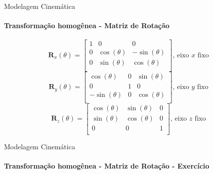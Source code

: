 \documentclass{beamer}
\begin{document}
\begin{frame}{Modelagem Cinemática}
    \framesubtitle{Transformação homogênea - Matriz de Rotação}
    \begin{block}{}
        \begin{equation*}
            \mathbf{R}_x(\theta) =
            \begin{bmatrix}
                1 & 0            & 0             \\
                0 & \cos(\theta) & -\sin(\theta) \\
                0 & \sin(\theta) & \cos(\theta)  \\
            \end{bmatrix} \text{, eixo $x$ fixo}
        \end{equation*}
        \begin{equation*}
            \mathbf{R}_y(\theta) =
            \begin{bmatrix}
                \cos(\theta)  & 0 & \sin(\theta) \\
                0             & 1 & 0            \\
                -\sin(\theta) & 0 & \cos(\theta) \\
            \end{bmatrix} \text{, eixo $y$ fixo}
        \end{equation*}
        \begin{equation*}
            \mathbf{R}_z(\theta) =
            \begin{bmatrix}
                \cos(\theta) & \sin(\theta) & 0 \\
                \sin(\theta) & \cos(\theta) & 0 \\
                0            & 0            & 1 \\
            \end{bmatrix} \text{, eixo $z$ fixo}
        \end{equation*}
    \end{block}
\end{frame}

\begin{frame}{Modelagem Cinemática}
    \framesubtitle{Transformação homogênea - Matriz de Rotação - Exercício}
\end{frame}
\end{document}
